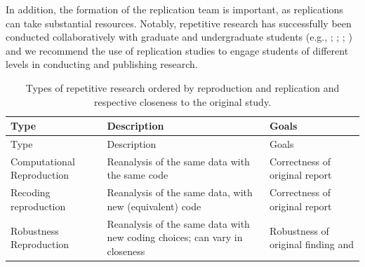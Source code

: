 \documentclass[
  letterpaper,
  DIV=11,
  openany,
  fontsize=12pt,
  parskip=half,
  headings=big,
  numbers=noenddot,
  titlepage=false]{scrreprt}
\begin{document}
In addition, the formation of the replication team is important, as
replications can take substantial resources. Notably, repetitive
research has successfully been conducted collaboratively with graduate
and undergraduate students (e.g., ; ;
;
) and we
recommend the use of replication studies to engage students of different
levels in conducting and publishing research.

\begin{longtable}[]{@{}
  >{\raggedright\arraybackslash}p{}
  >{\raggedright\arraybackslash}p{}
  >{\raggedright\arraybackslash}p{}@{}}
\caption{Types of repetitive research ordered by reproduction and
replication and respective closeness to the original
study.}\label{tbl-rep-types}\tabularnewline
\toprule\noalign{}
\begin{minipage}[b]{\linewidth}\raggedright
Type
\end{minipage} & \begin{minipage}[b]{\linewidth}\raggedright
Description
\end{minipage} & \begin{minipage}[b]{\linewidth}\raggedright
Goals
\end{minipage} \\
\midrule\noalign{}
\endfirsthead
\toprule\noalign{}
\begin{minipage}[b]{\linewidth}\raggedright
Type
\end{minipage} & \begin{minipage}[b]{\linewidth}\raggedright
Description
\end{minipage} & \begin{minipage}[b]{\linewidth}\raggedright
Goals
\end{minipage} \\
\midrule\noalign{}
\endhead
\bottomrule\noalign{}
\endlastfoot
Computational Reproduction & Reanalysis of the same data with the same
code & Correctness of original report \\
Recoding reproduction & Reanalysis of the same data, with new
(equivalent) code & Correctness of original report \\
Robustness Reproduction & Reanalysis of the same data with new coding
choices; can vary in closeness & Robustness of original finding and

\end{longtable}
\end{document}
